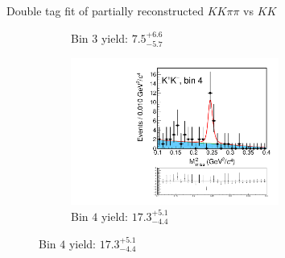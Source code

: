 \documentclass{beamer}
\begin{document}
\begin{frame}{Double tag fit of partially reconstructed $KK\pi\pi$ vs $KK$}
\begin{figure}
\begin{subfigure}{0.5\textwidth}
      \caption{Bin $3$ yield: $7.5_{-5.7}^{+6.6}$}
    \end{subfigure}%
    \begin{subfigure}{0.5\textwidth}
      \centering
      \includegraphics[width=0.75\textwidth,trim={0 5cm 0 0},clip=true]{Plots/DoubleTagYield_DoubleTag_CP_KKpipi_vs_KKPartReco_SignalBin4.pdf}
      \caption{Bin $4$ yield: $17.3_{-4.4}^{+5.1}$}
    \end{subfigure}
  \end{figure}
\end{frame}
\end{document}
